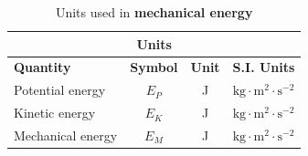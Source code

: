 \begin{table}[H]
\begin{center}
\begin{tabular}{|l|c|c|c|}\hline \hline 
\multicolumn{4}{|c|}{\textbf{Units}}\\ \hline \hline
\textbf{Quantity} & \textbf{Symbol} & \textbf{Unit} & \textbf{S.I. Units}\\ \hline
Potential energy & $E_{P}$ & J & $\text{kg} \cdot \text{m}^{2} \cdot \text{s}^{-2}$ \\ \hline
Kinetic energy & $E_{K}$ & J & $\text{kg} \cdot \text{m}^{2} \cdot \text{s}^{-2}$ \\ \hline
Mechanical energy & $E_{M}$ & J & $\text{kg} \cdot \text{m}^{2} \cdot \text{s}^{-2}$ \\ \hline
\end{tabular}
\end{center}
\caption{Units used in \textbf{mechanical energy} }
\label{table:electricity::units}
\end{table}
    \label{m38786*cid9}

